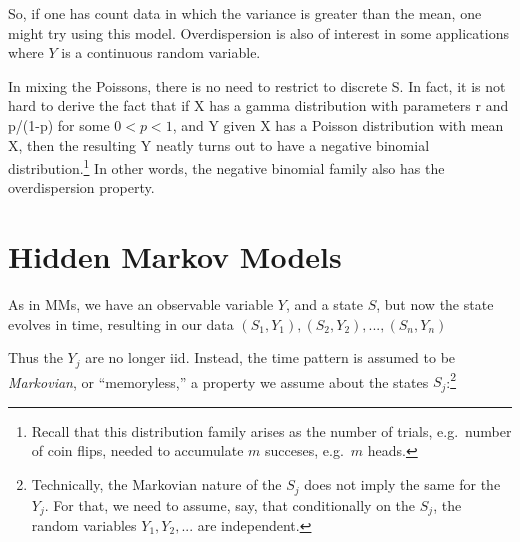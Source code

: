 \documentclass[11pt]{article}
\begin{document}
% 
% 
% 
% 
% 
% 
% 
% 
% 

So, if one has count data in which the variance is greater than the
mean, one might try using this model.  Overdispersion is also of
interest in some applications where $Y$ is a continuous random variable.

In mixing the Poissons, there is no need to restrict to discrete S.  In
fact, it is not hard to derive the fact that if X has a gamma
distribution with parameters r and p/(1-p) for some $0 < p < 1$, and Y
given X has a Poisson distribution with mean X, then the resulting Y
neatly turns out to have a negative binomial
distribution.\footnote{Recall that this distribution family arises as
the number of trials, e.g.\ number of coin flips, needed to accumulate
$m$ succeses, e.g.\ $m$ heads.}  In other words, the negative binomial
family also has the overdispersion property.

\section{Hidden Markov Models}

As in MMs, we have an observable variable $Y$, and a state $S$, but now
the state evolves in time, resulting in our data
$
(S_1,Y_1),
(S_2,Y_2),
...,
(S_n,Y_n)
$

Thus the $Y_j$ are no longer iid.  Instead, the time pattern is assumed
to be \textit{Markovian}, or ``memoryless,'' a property we assume about
the states $S_j$:\footnote{Technically, the Markovian nature of the
$S_j$ does not imply the same for the $Y_j$.  For that, we need to
assume, say, that conditionally on the $S_j$, the random variables $Y_1,
Y_2,...$ are independent.}
\end{document}
